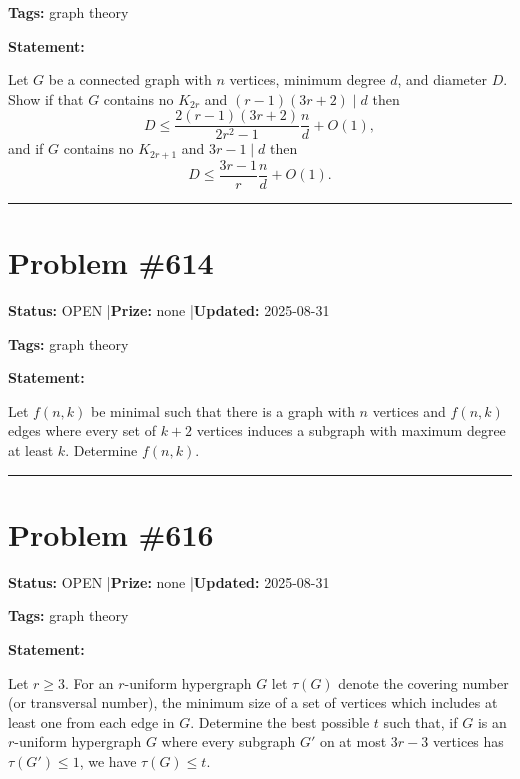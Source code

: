 \documentclass{article}
\begin{document}
\noindent\textbf{Tags:} graph theory

\medskip

\noindent\textbf{Statement:}

Let $G$ be a connected graph with $n$ vertices, minimum degree $d$, and diameter $D$. Show if that $G$ contains no $K_{2r}$ and $(r-1)(3r+2)\mid d$ then\[D\leq \frac{2(r-1)(3r+2)}{2r^2-1}\frac{n}{d}+O(1),\]and if $G$ contains no $K_{2r+1}$ and $3r-1 \mid d$ then\[D\leq \frac{3r-1}{r}\frac{n}{d}+O(1).\]

\noindent\rule{\linewidth}{0.4pt}


\section{Problem \#614}
\label{prob:614}

\noindent\textbf{Status:} OPEN \quad|\quad \textbf{Prize:} none \quad|\quad \textbf{Updated:} 2025-08-31

\noindent\textbf{Tags:} graph theory

\medskip

\noindent\textbf{Statement:}

Let $f(n,k)$ be minimal such that there is a graph with $n$ vertices and $f(n,k)$ edges where every set of $k+2$ vertices induces a subgraph with maximum degree at least $k$. Determine $f(n,k)$.

\noindent\rule{\linewidth}{0.4pt}


\section{Problem \#616}
\label{prob:616}

\noindent\textbf{Status:} OPEN \quad|\quad \textbf{Prize:} none \quad|\quad \textbf{Updated:} 2025-08-31

\noindent\textbf{Tags:} graph theory

\medskip

\noindent\textbf{Statement:}

Let $r\geq 3$. For an $r$-uniform hypergraph $G$ let $\tau(G)$ denote the covering number (or transversal number), the minimum size of a set of vertices which includes at least one from each edge in $G$. Determine the best possible $t$ such that, if $G$ is an $r$-uniform hypergraph $G$ where every subgraph $G'$ on at most $3r-3$ vertices has $\tau(G')\leq 1$, we have $\tau(G)\leq t$.
\end{document}
